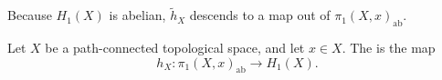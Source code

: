 \documentclass[main.tex]{subfiles}
\begin{document}
%
%
%


Because $H_{1}(X)$ is abelian, $\tilde{h}_{X}$ descends to a map out of $\pi_{1}(X, x)_{\mathrm{ab}}$.

\begin{definition}
  \label{def:hurewicz_homomorphism}
  Let $X$ be a path-connected topological space, and let $x \in X$. The  is the map
  \begin{equation*}
    h_{X}\colon \pi_{1}(X, x)_{\mathrm{ab}} \to H_{1}(X).
  \end{equation*}
\end{definition}
\end{document}
